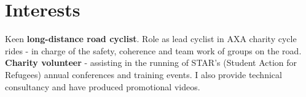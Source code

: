 \documentclass[11pt]{article}
\begin{document}
\section*{Interests}

Keen \textbf{long-distance road cyclist}. Role as lead cyclist in AXA charity cycle rides - in charge of the safety, coherence and team work of groups on the road.\\
\noindent \textbf{Charity volunteer} - assisting in the running of STAR's (Student Action for Refugees) annual conferences and training events.
I also provide technical consultancy and have produced promotional videos.

\end{document}

